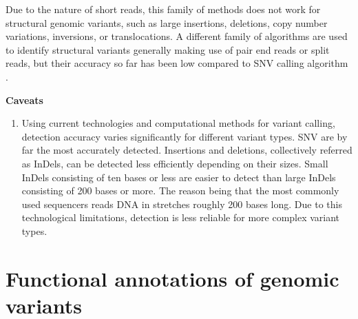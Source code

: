 Due to the nature of short reads, this family of methods does not work for structural genomic variants, such as large insertions, deletions, copy number variations, inversions, or translocations.  A different family of algorithms are used to identify structural variants generally making use of pair end reads or split reads, but their accuracy so far has been low compared to SNV calling algorithm \cite{o2013low}.

\textbf{Caveats}
	\begin{enumerate}[label=\roman*]
		\item Using current technologies and computational methods for variant calling, detection accuracy varies significantly for different variant types. SNV are by far the most accurately detected. Insertions and deletions, collectively referred as InDels, can be detected less efficiently depending on their sizes. Small InDels consisting of ten bases or less are easier to detect than large InDels consisting of 200 bases or more. The reason being that the most commonly used sequencers reads DNA in stretches roughly 200 bases long. Due to this technological limitations, detection is less reliable for more complex variant types.
	\end{enumerate}

\section{Functional annotations of genomic variants \label{sec:funann}}

